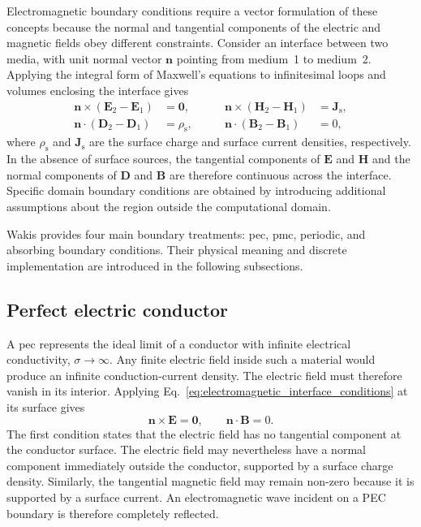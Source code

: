 Electromagnetic boundary conditions require a vector formulation of these concepts because the normal and tangential components of the electric and magnetic fields obey different constraints. Consider an interface between two media, with unit normal vector $\mathbf{n}$ pointing from medium~1 to medium~2. Applying the integral form of Maxwell's equations to infinitesimal loops and volumes enclosing the interface gives
%
\begin{equation}
\begin{aligned}
\mathbf{n}\times(\mathbf{E}_2-\mathbf{E}_1)&=\mathbf{0},
&\qquad
\mathbf{n}\times(\mathbf{H}_2-\mathbf{H}_1)&=\mathbf{J}_{\mathrm{s}},\\
\mathbf{n}\cdot(\mathbf{D}_2-\mathbf{D}_1)&=\rho_{\mathrm{s}},
&\qquad
\mathbf{n}\cdot(\mathbf{B}_2-\mathbf{B}_1)&=0,
\end{aligned}
\label{eq:electromagnetic_interface_conditions}
\end{equation}
%
where $\rho_{\mathrm{s}}$ and $\mathbf{J}_{\mathrm{s}}$ are the surface charge and surface current densities, respectively. In the absence of surface sources, the tangential components of $\mathbf{E}$ and $\mathbf{H}$ and the normal components of $\mathbf{D}$ and $\mathbf{B}$ are therefore continuous across the interface. Specific domain boundary conditions are obtained by introducing additional assumptions about the region outside the computational domain.

Wakis provides four main boundary treatments: \gls{pec}, \gls{pmc}, periodic, and absorbing boundary conditions. Their physical meaning and discrete implementation are introduced in the following subsections.

\subsection{Perfect electric conductor}
\label{sec:bc_pec}

A \gls{pec} represents the ideal limit of a conductor with infinite electrical conductivity, $\sigma\rightarrow\infty$. Any finite electric field inside such a material would produce an infinite conduction-current density. The electric field must therefore vanish in its interior. Applying Eq.~\eqref{eq:electromagnetic_interface_conditions} at its surface gives
%
\begin{equation}
\mathbf{n}\times\mathbf{E}=\mathbf{0},
\qquad
\mathbf{n}\cdot\mathbf{B}=0.
\label{eq:pec_boundary_conditions}
\end{equation}
%
The first condition states that the electric field has no tangential component at the conductor surface. The electric field may nevertheless have a normal component immediately outside the conductor, supported by a surface charge density. Similarly, the tangential magnetic field may remain non-zero because it is supported by a surface current. An electromagnetic wave incident on a PEC boundary is therefore completely reflected.

